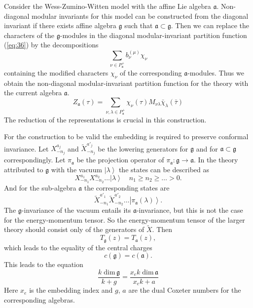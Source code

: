 \documentclass[a4paper,12pt]{article}
\theoremstyle{definition} \newtheorem{Def}{Definition}
\begin{document}
Consider the Wess-Zumino-Witten model with the affine Lie algebra $\mathfrak{a}$. Non-diagonal modular invariants for this model can be constructed from the diagonal invariant if there exists affine algebra $\mathfrak{g}$ such that $\mathfrak{a}\subset\mathfrak{g}$. 
Then we can replace the characters of the $\mathfrak{g}$-modules in the diagonal modular-invariant partition function (\ref{eq:36})
by the decompositions
\begin{equation}
  \label{eq:32}
\sum_{\nu \in P^{+}_{\mathfrak{a}}}b^{(\mu)}_{\nu} \chi_{\nu}  
\end{equation}
containing the modified characters $\chi_{\nu}$ of the corresponding $\mathfrak{a}$-modules. Thus we obtain the non-diagonal modular-invariant  partition function for the theory with the current algebra $\mathfrak{a}$.
\begin{equation}
  \label{eq:36}
   Z_{\mathfrak{a}}(\tau)=\sum_{ \nu,\lambda\in P^{+}_{\mathfrak{a}}} \chi_{\nu}(\tau)M_{\nu\lambda}\bar \chi_{\lambda}(\bar \tau)
\end{equation}
The reduction of the representations is crucial in this construction.

For the construction to be valid the embedding is required to preserve conformal invariance.
Let $X^{a_j}_{-n_j}$ and $\tilde{X}^{a'_j}_{-n_j}$ be the lowering generators for $\mathfrak{g}$ and for $\mathfrak{a}\subset\mathfrak{g}$ correspondingly. Let $\pi_{\mathfrak{a}}$ be the projection operator of $\pi_{\mathfrak{a}}:\mathfrak{g}\longrightarrow \mathfrak{a}$. In the theory attributed to $\mathfrak{g}$ with the vacuum $\left|\lambda\right>$ the states can be described as
\begin{equation}
  \label{eq:109}
  X^{a_1}_{-n_1}X^{a_2}_{-n_2}\dots\left|\lambda\right>\quad n_1\geq n_2\geq \dots>0.
\end{equation}
And for the sub-algebra $\mathfrak{a}$ the corresponding states are
\begin{equation}
  \label{eq:110}
  \tilde{X}^{a'_1}_{-n_1}\tilde{X}^{a'_2}_{-n_2}\dots\left|\pi_{\mathfrak{a}}(\lambda)\right>.
\end{equation}
The $\mathfrak{g}$-invariance of the vacuum entails its $\mathfrak{a}$-invariance, but this is not the case for the energy-momentum tensor. So the energy-momentum tensor of the larger theory should consist only of the generators of $\tilde{X}$. Then 
\begin{equation}
  \label{eq:2}
  T_{\mathfrak{g}}(z)=T_{\mathfrak{a}}(z),  
\end{equation}
which leads to the equality of the central charges 
\begin{equation}
  \label{eq:33}
  c(\mathfrak{g})=c(\mathfrak{a}).
\end{equation}
This leads to the equation
\begin{equation}
  \label{eq:111}
  \frac{k\;\mathrm{dim}\,\mathfrak{g}}{k+g}=\frac{x_e k\; \mathrm{dim}\,\mathfrak{a}}{x_ek+a}
\end{equation}
Here $x_e$ is the embedding index and $g$, $a$ are the dual Coxeter numbers for the  corresponding algebras.
\end{document}

